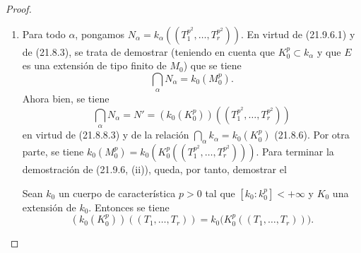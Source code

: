 \begin{proof}
\begin{enumerate}
  Se tiene además, por (21.6.4.2),
  \[
    d(E/L_0,M)-d(E/L_0,k_0)=d(E/L_0,M/k_0)
  \]
  y
  \[
    d(L_0/M_0,N)=d(L_0/M_0,N/k)+d(L_0/M_0,k).
  \]
  Pero como $L_0$ es separable sobre $K_0$ (21.9.6.4), se tiene
  $d(L_0/K_0,k)=0$, y por consiguiente también $d(L_0/M_0,k)=0$ ((21.6.2) y
  (21.6.4)). Se obtiene, por tanto,
  \[
    \delta=d(E/L_0,M/k_0)+d(L_0/M_0,N/k).
  \]
  Apliquemos de nuevo dos veces (21.6.4.2) al primer término del segundo
  miembro de esta fórmula; se obtiene
  \[
    d(E/L_0,M/k_0)=d(E/L_0,M/N)+d(E/L_0,N/k)+d(E/L_0,k/k_0).
  \]
  Como $M\subset N(L_0^p)$, se tiene $d(E/L_0,M/N)=0$ (21.6.2), luego (por
  (21.6.4.4))
  \[
    \delta=d(E/L_0,k/k_0)+d(E/M_0,N/k).
  \]
  Pero $M_0$ y $L_0$ son extensiones separables de $K_0$ (21.9.6.4), por lo
  que
  $d(L_0/K_0,k/k_0)=d(M_0/K_0,k/k_0)=0$
  (21.6.2), y aplicando de nuevo dos veces (21.6.4.4),

  se tiene
  $d(E/L_0,k/k_0)=d(E/K_0,k/k_0)=d(E/M_0,k/k_0)$,
  de donde, por una última aplicación de (21.6.4.2),
  \[
    \delta=d(E/M_0,N/k_0)\geqslant0
  \]
  lo que demuestra (21.9.6.1). Además, cuando $k$ se sustituye por una
  subextensión $k'$ de $k_0$, $N$ se sustituye por una subextensión $N'$, por
  lo que $d(E/M_0,N'/k_0)\leqslant d(E/M_0,N/k_0)$ (21.6.4.2), lo que
  demuestra la última afirmación de (i).

  \item[(ii)] Para todo $\alpha$, pongamos
  $N_\alpha=k_\alpha((T_1^{p^2},\ldots,T_r^{p^2}))$. En virtud de (21.9.6.1)
  y de (21.8.3), se trata de demostrar (teniendo en cuenta que
  $K_0^p\subset k_\alpha$ y que $E$ es una extensión de tipo finito de $M_0$)
  que se tiene
  \[
    \bigcap_\alpha N_\alpha=k_0(M_0^p).
  \]
  Ahora bien, se tiene
  \begin{equation}
  \tag{21.9.6.6}
  \label{0.21.9.6.6-fr}
    \bigcap_\alpha N_\alpha=N'
    =(k_0(K_0^p))((T_1^{p^2},\ldots,T_r^{p^2}))
  \end{equation}
  en virtud de (21.8.8.3) y de la relación
  $\bigcap_\alpha k_\alpha=k_0(K_0^p)$ (21.8.6). Por otra parte, se tiene
  $k_0(M_0^p)=k_0(K_0^p((T_1^{p^2},\ldots,T_r^{p^2})))$. Para terminar la
  demostración de (21.9.6, (ii)), queda, por tanto, demostrar el

  \begin{lemma}[21.9.6.7]
  \label{0.21.9.6.7-fr}
  Sean $k_0$ un cuerpo de característica $p>0$ tal que
  $[k_0:k_0^p]<+\infty$ y $K_0$ una extensión de $k_0$. Entonces se tiene
  \begin{equation}
  \tag{21.9.6.8}
  \label{0.21.9.6.8-fr}
    (k_0(K_0^p))((T_1,\ldots,T_r))
    =k_0\bigl(K_0^p((T_1,\ldots,T_r))\bigr).
  \end{equation}
  \end{lemma}


\end{enumerate}
\end{proof}
